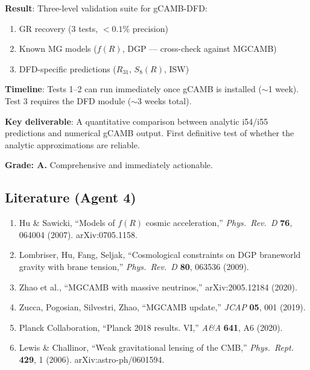 \documentclass[11pt,a4paper]{article}
\begin{document}
\begin{tcolorbox}[colback=green!5!white, colframe=green!60!black, title={Agent 4: Validation Suite --- SPECIFIED}]
\textbf{Result}: Three-level validation suite for gCAMB-DFD:
\begin{enumerate}
\item GR recovery (3 tests, $< 0.1\%$ precision)
\item Known MG models ($f(R)$, DGP --- cross-check against MGCAMB)
\item DFD-specific predictions ($R_{31}$, $S_8(R)$, ISW)
\end{enumerate}

\textbf{Timeline}: Tests 1--2 can run immediately once gCAMB is installed ($\sim$1 week). Test 3 requires the DFD module ($\sim$3 weeks total).

\textbf{Key deliverable}: A quantitative comparison between analytic i54/i55 predictions and numerical gCAMB output. First definitive test of whether the analytic approximations are reliable.

\textbf{Grade: A.} Comprehensive and immediately actionable.
\end{tcolorbox}

\subsection{Literature (Agent 4)}

\begin{enumerate}
\item Hu \& Sawicki, ``Models of $f(R)$ cosmic acceleration,'' \textit{Phys.\ Rev.\ D} \textbf{76}, 064004 (2007). arXiv:0705.1158.
\item Lombriser, Hu, Fang, Seljak, ``Cosmological constraints on DGP braneworld gravity with brane tension,'' \textit{Phys.\ Rev.\ D} \textbf{80}, 063536 (2009).
\item Zhao et al., ``MGCAMB with massive neutrinos,'' arXiv:2005.12184 (2020).
\item Zucca, Pogosian, Silvestri, Zhao, ``MGCAMB update,'' \textit{JCAP} \textbf{05}, 001 (2019).
\item Planck Collaboration, ``Planck 2018 results. VI,'' \textit{A\&A} \textbf{641}, A6 (2020).
\item Lewis \& Challinor, ``Weak gravitational lensing of the CMB,'' \textit{Phys.\ Rept.} \textbf{429}, 1 (2006). arXiv:astro-ph/0601594.
\end{enumerate}


\end{document}
